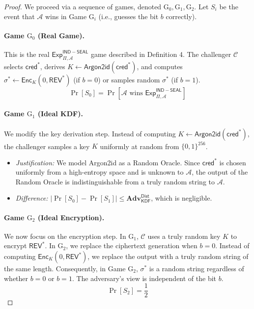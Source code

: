 \documentclass[12pt,a4paper]{article}
\begin{document}
  \begin{proof}
   We proceed via a sequence of games, denoted $\mathrm{G}_0, \mathrm{G}_1, \mathrm{G}_2$. Let $S_i$ be the event that $\mathcal{A}$ wins in Game $\mathrm{G}_i$ (i.e., guesses the bit $b$ correctly).

   \paragraph{Game $\mathrm{G}_0$ (Real Game).}
   This is the real $\mathsf{Exp}_{\Pi, \mathcal{A}}^{\mathsf{IND-SEAL}}$ game described in Definition 4.
   The challenger $\mathcal{C}$ selects $\mathsf{cred}^*$, derives $K \leftarrow \mathsf{Argon2id}(\mathsf{cred}^*)$, and computes $\sigma^* \leftarrow \mathsf{Enc}_K(0, \mathsf{REV}^*)$ (if $b=0$) or samples random $\sigma^*$ (if $b=1$).
   \[
  \Pr[S_0] = \Pr[\mathcal{A} \text{ wins } \mathsf{Exp}_{\Pi, \mathcal{A}}^{\mathsf{IND-SEAL}}]
   \]

   \paragraph{Game $\mathrm{G}_1$ (Ideal KDF).}
   We modify the key derivation step. Instead of computing $K \leftarrow \mathsf{Argon2id}(\mathsf{cred}^*)$, the challenger samples a key $K$ uniformly at random from $\{0,1\}^{256}$.
   \begin{itemize}
  \item \textit{Justification:} We model Argon2id as a Random Oracle. Since $\mathsf{cred}^*$ is chosen uniformly from a high-entropy space and is unknown to $\mathcal{A}$, the output of the Random Oracle is indistinguishable from a truly random string to $\mathcal{A}$.
  \item \textit{Difference:} $|\Pr[S_0] - \Pr[S_1]| \le \mathbf{Adv}_{\mathsf{KDF}}^{\mathsf{Dist}}$, which is negligible.
   \end{itemize}

   \paragraph{Game $\mathrm{G}_2$ (Ideal Encryption).}
   We now focus on the encryption step. In $\mathrm{G}_1$, $\mathcal{C}$ uses a truly random key $K$ to encrypt $\mathsf{REV}^*$. In $\mathrm{G}_2$, we replace the ciphertext generation when $b=0$. Instead of computing $\mathsf{Enc}_K(0, \mathsf{REV}^*)$, we replace the output with a truly random string of the same length.
   Consequently, in Game $\mathrm{G}_2$, $\sigma^*$ is a random string regardless of whether $b=0$ or $b=1$. The adversary's view is independent of the bit $b$.
   \[
  \Pr[S_2] = \frac{1}{2}
   \]


\end{proof}
\end{document}
